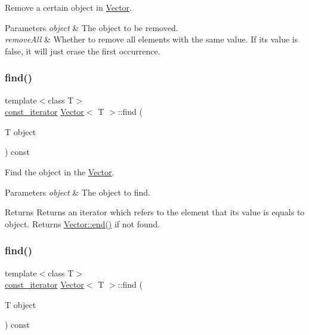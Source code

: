 Remove a certain object in \hyperlink{classVector}{Vector}. 
\begin{DoxyParams}{Parameters}
{\em object} & The object to be removed. \\
\hline
{\em remove\+All} & Whether to remove all elements with the same value. If its value is \textquotesingle{}false\textquotesingle{}, it will just erase the first occurrence. \\
\hline
\end{DoxyParams}
\mbox{\label{classVector_a9ae8f35e4ea3ec88ebeda0b20bcf7d35}} 
\subsubsection{\texorpdfstring{find()}{find()}\hspace{0.1cm}{\footnotesize\ttfamily [1/4]}}
{\footnotesize\ttfamily template$<$class T$>$ \\
\hyperlink{classVector_a484e934cc06bb84c7d70042e792b6e55}{const\+\_\+iterator} \hyperlink{classVector}{Vector}$<$ T $>$\+::find (\begin{DoxyParamCaption}\item[{T}]{object }\end{DoxyParamCaption}) const\hspace{0.3cm}{\ttfamily [inline]}}



Find the object in the \hyperlink{classVector}{Vector}. 


\begin{DoxyParams}{Parameters}
{\em object} & The object to find. \\
\hline
\end{DoxyParams}
\begin{DoxyReturn}{Returns}
Returns an iterator which refers to the element that its value is equals to object. Returns \hyperlink{classVector_ae288fa619188bff101d5300b8aaf9a90}{Vector\+::end()} if not found. 
\end{DoxyReturn}
\mbox{\label{classVector_a9ae8f35e4ea3ec88ebeda0b20bcf7d35}} 
\subsubsection{\texorpdfstring{find()}{find()}\hspace{0.1cm}{\footnotesize\ttfamily [2/4]}}
{\footnotesize\ttfamily template$<$class T$>$ \\
\hyperlink{classVector_a484e934cc06bb84c7d70042e792b6e55}{const\+\_\+iterator} \hyperlink{classVector}{Vector}$<$ T $>$\+::find (\begin{DoxyParamCaption}\item[{T}]{object }\end{DoxyParamCaption}) const\hspace{0.3cm}{\ttfamily [inline]}}




